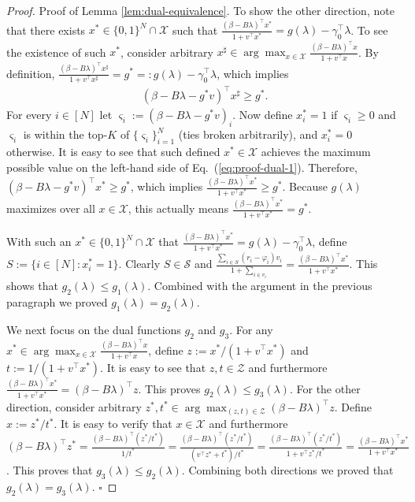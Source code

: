 \documentclass[opre]{informs3aa}
\newcommand{\mS}{\mathcal S}
\newcommand{\mX}{\mathcal X}
\newcommand{\mZ}{\mathcal Z}
\begin{document}
\begin{appendices}
{\begin{proof}{Proof of Lemma \ref{lem:dual-equivalence}.}
To show the other direction, note that there exists $x^*\in\{0,1\}^N\cap\mX$ such that $\frac{(\beta-B\lambda)^\top x^*}{1+v^\top x^*} = g(\lambda)-\gamma_0^\top\lambda$.
To see the existence of such $x^*$, consider arbitrary $x^\sharp \in\arg\max_{x\in\mX}\frac{(\beta-B\lambda)^\top x}{1+v^\top x} $.
By definition, $\frac{(\beta-B\lambda)^\top x^\sharp}{1+v^\top x^\sharp} = g^*=:g(\lambda)-\gamma_0^\top\lambda$, which implies 
\begin{align}
(\beta-B\lambda-g^*v)^\top x^\sharp \geq g^*.
\label{eq:proof-dual-1}
\end{align}
For every $i\in[N]$ let $\varsigma_i := (\beta-B\lambda -g^*v)_i$. Now define $x_i^*=1$ if $\varsigma_i\geq 0$ and $\varsigma_i$ is within the top-$K$ of $\{\varsigma_i\}_{i=1}^N$ (ties broken arbitrarily),
and $x_i^*=0$ otherwise. It is easy to see that such defined $x^*\in\mX$ achieves the maximum possible value on the left-hand side of Eq.~(\ref{eq:proof-dual-1}).
Therefore, $(\beta-B\lambda-g^*v)^\top x^* \geq g^*$, which implies $\frac{(\beta-B\lambda)^\top x^*}{1+v^\top x^*} \geq g^*$.
Because $g(\lambda)$ maximizes over all $x\in\mX$, this actually means $\frac{(\beta-B\lambda)^\top x^*}{1+v^\top x^*} = g^*$.

With such an $x^*\in\{0,1\}^N\cap\mX$ that $\frac{(\beta-B\lambda)^\top x^*}{1+v^\top x^*} = g(\lambda)-\gamma_0^\top\lambda$,
define $S:= \{i\in[N]: x_i^*=1\}$. Clearly $S\in\mS$ and $\frac{\sum_{i\in S}(r_i-\varphi_i)v_i}{1+\sum_{i\in v_i}} = \frac{(\beta-B\lambda)^\top x^*}{1+v^\top x^*}$.
This shows that $g_2(\lambda) \leq g_1(\lambda)$. Combined with the argument in the previous paragraph we proved $g_1(\lambda)=g_2(\lambda)$.

We next focus on the dual functions $g_2$ and $g_3$. For any $x^*\in\arg\max_{x\in\mX}\frac{(\beta-B\lambda)^\top x}{1+v^\top x}$,
define $z := x^* / (1+v^\top x^*)$ and $t:= 1/(1+v^\top x^*)$. It is easy to see that $z,t\in\mZ$ and furthermore $\frac{(\beta-B\lambda)^\top x^*}{1+v^\top x^*} = (\beta-B\lambda)^\top z$. This proves $g_2(\lambda)\leq g_3(\lambda)$. For the other direction, consider arbitrary $z^*,t^*\in\arg\max_{(z,t)\in\mZ}(\beta-B\lambda)^\top z$.
Define $x := z^*/t^*$. It is easy to verify that $x\in\mX$ and furthermore $(\beta-B\lambda)^\top z^* =\frac{(\beta-B\lambda)^\top (z^*/t^*)}{1/t^*}=\frac{(\beta-B\lambda)^\top(z^*/t^*)}{(v^\top z^*+t^*)/t^*} = \frac{(\beta-B\lambda)^\top(z^*/t^*)}{1+v^\top z^*/t^*} = \frac{(\beta-B\lambda)^\top x^*}{1+v^\top x^*}$.
This proves that $g_3(\lambda)\leq g_2(\lambda)$. Combining both directions we proved that $g_2(\lambda)=g_3(\lambda)$. $\square$
\end{proof}

}
\end{appendices}
\end{document}

